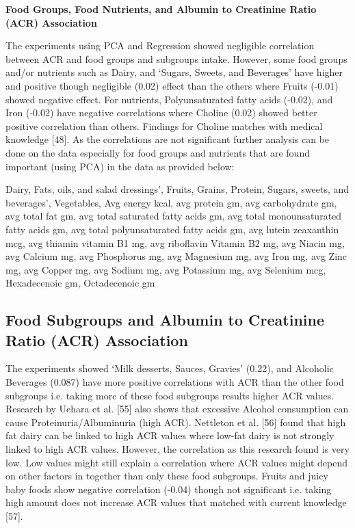 \noindent \textbf{Food Groups, Food Nutrients, and Albumin to Creatinine Ratio (ACR) Association}

\noindent The experiments using PCA and Regression showed negligible correlation between ACR and food groups and subgroups intake. However, some food groups and/or nutrients such as Dairy, and  `Sugars, Sweets, and Beverages'  have higher and positive though negligible (0.02) effect than the others where Fruits (-0.01) showed negative effect.  For nutrients, Polyunsaturated fatty acids (-0.02), and Iron (-0.02) have negative correlations where Choline (0.02) showed better positive correlation than others. Findings for Choline matches with medical knowledge [48]. As the correlations are not significant further analysis can be done on the data especially for food groups and nutrients that are found important (using PCA) in the data as provided below:

\noindent Dairy,  Fats, oils, and salad dressings’,  Fruits,  Grains,  Protein,   Sugars, sweets, and beverages’, Vegetables, Avg energy kcal,  avg protein gm,  avg carbohydrate gm,  avg total fat gm,  avg total saturated fatty acids gm, avg total monounsaturated fatty acids gm,  avg total polyunsaturated fatty acids gm, avg lutein zeaxanthin mcg,  avg thiamin vitamin B1 mg,  avg riboflavin Vitamin B2 mg,  avg Niacin mg, avg Calcium mg,  avg Phosphorus mg,  avg Magnesium mg,  avg Iron mg, avg Zinc mg,  avg Copper mg,  avg Sodium mg,  avg Potassium mg,  avg Selenium mcg,  Hexadecenoic gm,  Octadecenoic gm

\subsection{Food Subgroups and Albumin to Creatinine Ratio (ACR) Association}

\noindent The experiments showed  `Milk desserts, Sauces, Gravies' (0.22), and Alcoholic Beverages (0.087) have more positive correlations with ACR than the other food subgroups  i.e. taking more of these food subgroups results higher ACR values. Research by Uehara et al. [55] also shows that excessive Alcohol consumption can cause Proteinuria/Albuminuria (high ACR). Nettleton et al. [56] found that high fat dairy can be linked to high ACR values where low-fat dairy is not strongly linked to high ACR values. However, the correlation as this research found is very low. Low values might still explain a correlation where ACR values might depend on other factors in together than only these food subgroups. Fruits and juicy baby foods show negative correlation (-0.04) though not significant i.e. taking high amount does not increase ACR values that matched with current knowledge [57].


